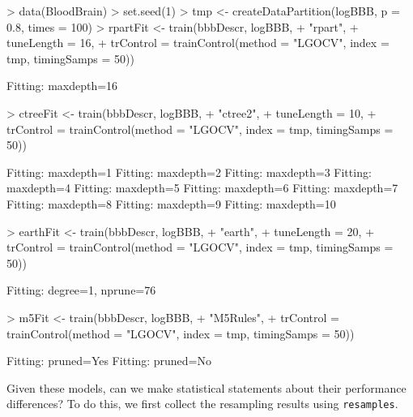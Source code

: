 \documentclass[12pt]{article}
\newcommand{\code}[1]{\mbox{\footnotesize\color{darkblue}\texttt{#1}}}
\renewenvironment{Schunk}{\vspace{\topsep}}{\vspace{\topsep}}
\begin{document}
\begin{Schunk}
\begin{Sinput}
> data(BloodBrain)
> set.seed(1)
> tmp <- createDataPartition(logBBB, p = 0.8, times = 100)
> rpartFit <- train(bbbDescr, logBBB,
+                   "rpart", 
+                   tuneLength = 16,
+                   trControl = trainControl(method = "LGOCV", index = tmp, timingSamps = 50))
\end{Sinput}
\begin{Soutput}
Fitting: maxdepth=16 
\end{Soutput}
\begin{Sinput}
> ctreeFit <- train(bbbDescr, logBBB,
+                  "ctree2",
+                   tuneLength = 10,
+                   trControl = trainControl(method = "LGOCV", index = tmp, timingSamps = 50))
\end{Sinput}
\begin{Soutput}
Fitting: maxdepth=1 
Fitting: maxdepth=2 
Fitting: maxdepth=3 
Fitting: maxdepth=4 
Fitting: maxdepth=5 
Fitting: maxdepth=6 
Fitting: maxdepth=7 
Fitting: maxdepth=8 
Fitting: maxdepth=9 
Fitting: maxdepth=10 
\end{Soutput}
\begin{Sinput}
> earthFit <- train(bbbDescr, logBBB,
+                   "earth",
+                   tuneLength = 20,
+                   trControl = trainControl(method = "LGOCV", index = tmp, timingSamps = 50))
\end{Sinput}
\begin{Soutput}
Fitting: degree=1, nprune=76 
\end{Soutput}
\end{Schunk}
\begin{Sinput}
> m5Fit <- train(bbbDescr, logBBB,
+                "M5Rules",
+                trControl = trainControl(method = "LGOCV", index = tmp, timingSamps = 50))    
\end{Sinput}
\begin{Soutput}
Fitting: pruned=Yes 
Fitting: pruned=No 
\end{Soutput}


Given these models, can we make statistical statements about their
performance differences? To do this, we first collect the resampling
results using \code{resamples}. 
\end{document}
